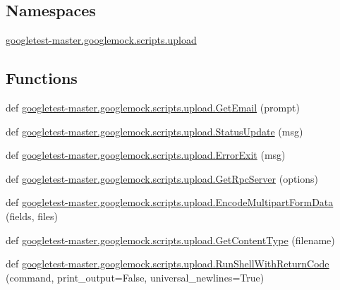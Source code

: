 \subsection*{Namespaces}
\begin{DoxyCompactItemize}
\item 
 \mbox{\hyperlink{namespacegoogletest-master_1_1googlemock_1_1scripts_1_1upload}{googletest-\/master.\+googlemock.\+scripts.\+upload}}
\end{DoxyCompactItemize}
\subsection*{Functions}
\begin{DoxyCompactItemize}
\item 
def \mbox{\hyperlink{namespacegoogletest-master_1_1googlemock_1_1scripts_1_1upload_aaff3f0ee04efd2f077d6f89ce98c0661}{googletest-\/master.\+googlemock.\+scripts.\+upload.\+Get\+Email}} (prompt)
\item 
def \mbox{\hyperlink{namespacegoogletest-master_1_1googlemock_1_1scripts_1_1upload_a06c407bee2581c8b821515280d54ef51}{googletest-\/master.\+googlemock.\+scripts.\+upload.\+Status\+Update}} (msg)
\item 
def \mbox{\hyperlink{namespacegoogletest-master_1_1googlemock_1_1scripts_1_1upload_a7c60b0ba49465c87fe470bfe18c56845}{googletest-\/master.\+googlemock.\+scripts.\+upload.\+Error\+Exit}} (msg)
\item 
def \mbox{\hyperlink{namespacegoogletest-master_1_1googlemock_1_1scripts_1_1upload_a2b6e6df75101a580e275ed816ebba25d}{googletest-\/master.\+googlemock.\+scripts.\+upload.\+Get\+Rpc\+Server}} (options)
\item 
def \mbox{\hyperlink{namespacegoogletest-master_1_1googlemock_1_1scripts_1_1upload_a26e47310825b8e956fdc8dbbd9d5a7e9}{googletest-\/master.\+googlemock.\+scripts.\+upload.\+Encode\+Multipart\+Form\+Data}} (fields, files)
\item 
def \mbox{\hyperlink{namespacegoogletest-master_1_1googlemock_1_1scripts_1_1upload_a290c1f445b5c84a6158ea7f0d12c8948}{googletest-\/master.\+googlemock.\+scripts.\+upload.\+Get\+Content\+Type}} (filename)
\item 
def \mbox{\hyperlink{namespacegoogletest-master_1_1googlemock_1_1scripts_1_1upload_a581e2d89c0a877b77e948253bf5329f3}{googletest-\/master.\+googlemock.\+scripts.\+upload.\+Run\+Shell\+With\+Return\+Code}} (command, print\+\_\+output=False, universal\+\_\+newlines=True)
\item 

\end{DoxyCompactItemize}
